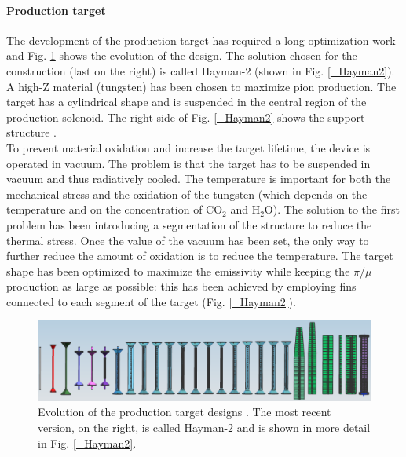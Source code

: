 \documentclass[12pt,a4paper,openright, oneside, titlepage]{book} %
\begin{document}
\paragraph{Production target}
The development of the production target has required a long optimization work and Fig.  \ref{_production_target_history} shows  the evolution of the design.
The solution chosen for the construction (last on the right) is called Hayman-2 (shown in Fig. \ref{_Hayman2}).\\
A high-Z material (tungsten) has been chosen to maximize pion production. 
The target has a cylindrical shape and is suspended in the central region of the production solenoid.
The right side of Fig. \ref{_Hayman2} shows the support structure \cite{Pushka_Hayman2} \cite{bob_Hayman2}.\\
To prevent material oxidation and increase the target lifetime, the device is operated in vacuum. 
The problem is that the target has to be suspended in vacuum and thus radiatively cooled.
The temperature is important for both the mechanical stress and the oxidation of the tungsten (which depends on the temperature and on the concentration of CO$_2$ and H$_2$O).
The solution to the first problem has been introducing a segmentation of the structure to reduce the thermal stress. 
Once the value of the vacuum has been set, the only way to further reduce the amount of oxidation is to reduce the temperature. 
The target shape has been optimized to maximize the emissivity while keeping the $\pi$/$\mu$ production as large as possible: this has been achieved by employing fins connected to each segment of the target (Fig. \ref{_Hayman2}).

\begin{figure}[h!]
\centering
\includegraphics[scale=0.5]{production_target_history}
\caption[Production target history]{Evolution of the production target designs \cite{Pushka_Hayman2}. 
The most recent version, on the right, is called Hayman-2 and is shown in more detail in Fig. \ref{_Hayman2}.}
\label{_production_target_history}
\end{figure}
\end{document}
